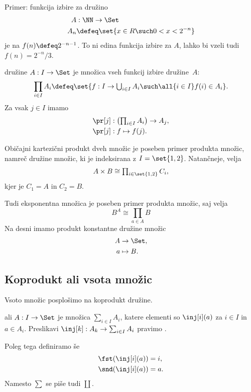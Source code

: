  \begin{zgled}
   Primer: funkcija izbire za družino
   \begin{align*}
   A &: \NN \to \Set \\
   A_n &\defeq \set{ x \in R \such 0 < x < 2^{-n} }
   \end{align*}
   je na $f(n) \defeq 2^{-n - 1}$. To ni edina funkcija izbire za $A$, lahko bi vzeli tudi $f(n) = 2^{-n} / 3$.
 \end{zgled}

 \begin{definicija}
    družine $A : I \to \Set$ je množica vseh funkcij izbire družine~$A$:
   \begin{equation*}
     \prod_{i \in I} A_i \defeq
     \set{f : I \to \textstyle\bigcup_{i \in I} A_i \such \all{i \in I} f(i) \in A_i}.
   \end{equation*}
   Za vsak $j \in I$ imamo 
   \begin{align*}
    \pr[j] &:  \left(\textstyle\prod_{i \in I} A_i\right) \to A_j, \\
    \pr[j] &:  f \mapsto f(j).
   \end{align*}
 \end{definicija}

Običajni kartezični produkt dveh množic je poseben primer produkta množic, namreč družine
množic, ki je indeksirana z $I = \set{1, 2}$. Natančneje, velja
%
\begin{equation*}
  A \times B \cong \textstyle\prod_{i \in \set{1, 2}} C_i,
\end{equation*}
%
kjer je $C_1 = A$ in $C_2 = B$.

Tudi eksponentna množica je poseben primer produkta množic, saj velja
%
\begin{equation*}
  B^A \cong \textstyle\prod_{a \in A} B
\end{equation*}
%
Na desni imamo produkt konstantne družine množic
\begin{align*}
  A &\to \Set, \\
  a &\mapsto B.
\end{align*}


\subsection{Koprodukt ali vsota množic}

Vsoto množic posplošimo na koprodukt družine.

\begin{definicija}
   ali  $A : I \to \Set$ je množica
  $\sum_{i \in I} A_i$, katere elementi so $\inj[i](a)$ za $i \in I$ in $a \in A_i$.
  Preslikavi $\inj[k] : A_k \to \sum_{i \in I} A_i$ pravimo .

  Poleg tega definiramo še 
  \begin{align*}
    \fst (\inj[i](a)) &= i, \\
    \snd (\inj[i](a)) &= a.
  \end{align*}
  Namesto $\sum$ se piše tudi $\coprod$.
\end{definicija}

